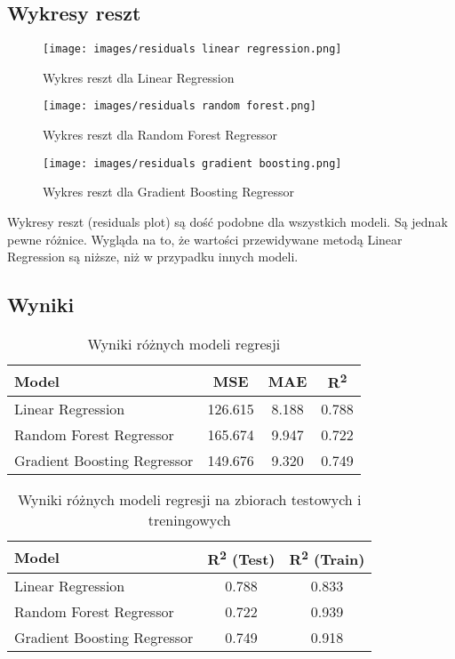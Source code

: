\documentclass{article}
\begin{document}
\subsection{Wykresy reszt}

\begin{figure}[H]
    \centering
    \texttt{[image: images/residuals linear regression.png]}
    \caption{Wykres reszt dla Linear Regression}
\end{figure}
\begin{figure}[H]
    \centering
    \texttt{[image: images/residuals random forest.png]}
    \caption{Wykres reszt dla Random Forest Regressor}
\end{figure}
\begin{figure}[H]
    \centering
    \texttt{[image: images/residuals gradient boosting.png]}
    \caption{Wykres reszt dla Gradient Boosting Regressor}
\end{figure}

Wykresy reszt (residuals plot) są dość podobne dla wszystkich modeli. Są jednak pewne różnice. Wygląda na to, że wartości przewidywane metodą Linear Regression są niższe, niż w przypadku innych modeli.

\subsection{Wyniki}

\begin{table}[H]
    \centering
    \caption{Wyniki różnych modeli regresji}
    \label{tab:model_results}
    \begin{tabular}{lccc}
        \toprule
        \textbf{Model} & \textbf{MSE} & \textbf{MAE} & \textbf{R\textsuperscript{2}} \\
        \midrule
        Linear Regression & 126.615 & 8.188 & 0.788 \\
        Random Forest Regressor & 165.674 & 9.947 & 0.722 \\
        Gradient Boosting Regressor & 149.676 & 9.320 & 0.749 \\
        \bottomrule
    \end{tabular}
\end{table}

\begin{table}[H]
    \centering
    \caption{Wyniki różnych modeli regresji na zbiorach testowych i treningowych}
    \begin{tabular}{lcc}
        \toprule
        \textbf{Model} & \textbf{R\textsuperscript{2} (Test)} & \textbf{R\textsuperscript{2} (Train)} \\
        \midrule
        Linear Regression & 0.788 & 0.833 \\
        Random Forest Regressor & 0.722 & 0.939 \\
        Gradient Boosting Regressor & 0.749 & 0.918 \\
        \bottomrule
    \end{tabular}
\end{table}
\end{document}
